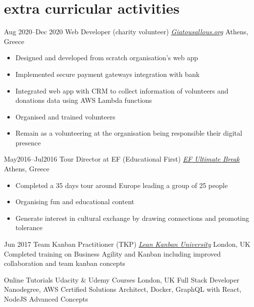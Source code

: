 \begin{entrylist}
\end{entrylist}
\vspace{-0.2cm}
\vspace{-.1cm}
\section{\normalfont extra curricular activities}
\vspace{-.1cm}
\begin{entrylist}

\entry
{Aug 2020--Dec 2020}
{Web Developer (charity volunteer) {\normalfont \emph{\href{https://www.giatousallous.org/}{Giatousallous.org}}}}
{Athens, Greece}
\vspace{-0.6cm}
\begin{itemize}[leftmargin=.6cm]
	\item Designed and developed from scratch organisation's web app
	\item Implemented secure payment gateways integration with bank
	\item Integrated web app with CRM to collect information of volunteers and donations data using AWS Lambda functions
	\item Organised and trained volunteers
	\item Remain as a volunteering at the organisation being responsible their digital presence
\end{itemize}

\entry
{May2016–Jul2016}
{Tour Director at EF (Educational First)  {\normalfont \emph{\href{https://www.efultimatebreak.com/}{EF Ultimate Break}}}}
{Athens, Greece}
\vspace{-0.6cm}
\begin{itemize}[leftmargin=.6cm]	
	\item Completed a 35 days tour around Europe leading a group of 25 people
	\item Organising fun and educational content
	\item Generate interest in cultural exchange by drawing connections and promoting tolerance
\end{itemize}

\entry
{Jun 2017}
 {Team Kanban Practitioner (TKP) {\normalfont \emph{\href{https://edu.leankanban.com/}{Lean Kanban University}}}} 
{London, UK} 
{Completed training on Business Agility and Kanban including improved collaboration and team kanban concepts}

\entry
{Online Tutorials}
 {Udacity \& Udemy Courses}
{London, UK} 
{Full Stack Developer Nanodegree, AWS Certified Solutions Architect, Docker, GraphQL with React, NodeJS Advanced Concepts}
\end{entrylist}
